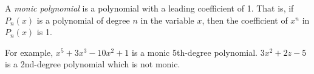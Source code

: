 \documentclass[12pt]{article}
\begin{document}
A \emph{monic polynomial} is a polynomial with a leading coefficient of 1.  That is, if $P_n(x)$ is a polynomial of degree $n$ in the variable $x$, then the coefficient of $x^n$ in $P_n(x)$ is 1.

For example, $x^5+3x^3-10x^2+1$ is a monic 5th-degree polynomial.  $3x^2+2z-5$ is a 2nd-degree polynomial which is not monic.
\end{document}
